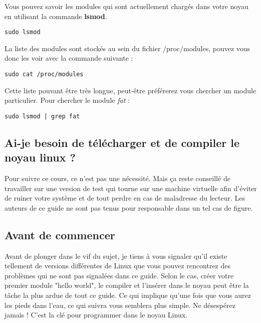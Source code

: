 \documentclass[11pt]{article}
\begin{document}
Vous pouvez savoir les modules qui sont actuellement chargés dans votre noyau en utilisant la commande \textbf{lsmod}.

\begin{verbatim}
sudo lsmod
\end{verbatim}

La liste des modules sont stockés au sein du fichier /proc/modules, pouvez vous donc les voir avec la commande suivante :

\begin{verbatim}
sudo cat /proc/modules
\end{verbatim}

Cette liste pouvant être très longue, peut-être préférerez vous chercher un module particulier. Pour chercher le module \emph{fat} :

\begin{verbatim}
sudo lsmod | grep fat
\end{verbatim}

\subsection*{Ai-je besoin de télécharger et de compiler le noyau linux ?}
\label{sec-1-7}

Pour suivre ce cours, ce n'est pas une nécessité. Mais ça reste conseillé de travailler sur une version de test qui tourne sur une machine virtuelle afin d'éviter de ruiner votre système et de tout perdre en cas de maladresse du lecteur. Les auteurs de ce guide ne sont pas tenus pour responsable dans un tel cas de figure.

\subsection*{Avant de commencer}
\label{sec-1-8}

Avant de plonger dans le vif du sujet, je tiens à vous signaler qu'il existe tellement de versions différentes de Linux que vous pouvez rencontrez des problèmes qui ne sont pas signalées dans ce guide. Selon le cas, créer votre premier module "hello world", le compiler et l'insérer dans le noyau peut être la tâche la plus ardue de tout ce guide. Ce qui implique qu'une fois que vous aurez les pieds dans l'eau, ce qui suivra vous semblera plus simple. Ne désespérez jamais ! C'est la clé pour programmer dans le noyau Linux.
\end{document}
